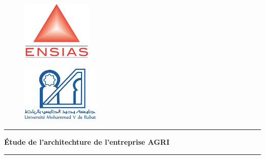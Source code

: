 \documentclass[a4paper]{report}
\author{Kotbi Abderrahamane}
\date{Thursday, July 1st 2021}
\begin{document}
\begin{titlepage}
  \begin{center}
      \begin{figure}[!h]
          \vspace{- 2 cm}
          \hspace{ 0 cm}
          \includegraphics[width=9em]{ensias.jpeg}
      \end{figure}
      \begin{figure}[!h]
          \vspace{- 3.34cm}
          \hspace{14cm}
          \includegraphics[width=10em]{um5.jpeg}
      \end{figure}
  \end{center}

  \begin{center}
      \begin{center}
          \rule{0.9\linewidth}{1pt}
      \end{center}
      \vspace*{0.2cm}
      \noindent \hspace{ 0.3 cm }\Huge \textbf{Étude de l'architechture de l'entreprise AGRI}
      \begin{center}
          \rule{0.9\linewidth}{1pt}
      \end{center}


\end{center}
\end{titlepage}
\end{document}
